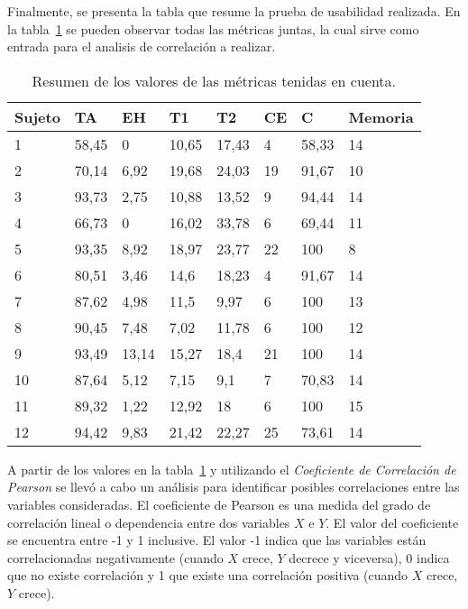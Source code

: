 Finalmente, se presenta la tabla que resume la prueba de usabilidad realizada. En la tabla~\ref{sec:tabla-resumen-prueba}
se pueden observar todas las m\'etricas juntas, la cual sirve como entrada para el analisis de correlaci\'on a realizar.

\begin{table}[H]
\centering
\footnotesize
\begin{tabular}{|p{1.6cm}|p{1.6cm}|p{1.6cm}|p{1.6cm}|p{1.6cm}|p{1.6cm}|p{1.6cm}|p{1.6cm}|}
\hline
    Sujeto & TA    &    EH & T1    & T2  & CE &  C    & Memoria \\
    \hline 
    1      & 58,45 & 0     & 10,65 & 17,43 & 4  & 58,33 & 14 \\
    2      & 70,14 & 6,92  & 19,68 & 24,03 & 19 & 91,67 & 10 \\
    3      & 93,73 & 2,75  & 10,88 & 13,52 & 9  & 94,44 & 14 \\
    4      & 66,73 & 0     & 16,02 & 33,78 & 6  & 69,44 & 11 \\
    5      & 93,35 & 8,92  & 18,97 & 23,77 & 22 & 100   & 8  \\
    6      & 80,51 & 3,46  & 14,6  & 18,23 & 4  & 91,67 & 14 \\
    7      & 87,62 & 4,98  &  11,5 & 9,97  & 6  & 100   & 13 \\
    8      & 90,45 & 7,48  & 7,02  & 11,78 & 6  & 100   & 12 \\
    9      & 93,49 & 13,14 & 15,27 & 18,4  & 21 & 100   & 14 \\
    10     & 87,64 & 5,12  & 7,15  & 9,1   & 7  & 70,83 & 14 \\
    11     & 89,32 & 1,22  & 12,92 & 18    & 6  & 100   & 15 \\
    12     & 94,42 & 9,83  & 21,42 & 22,27 & 25 & 73,61 & 14 \\
\hline
\end{tabular}
\caption{Resumen de los valores de las métricas tenidas en cuenta.}
\label{sec:tabla-resumen-prueba}
\end{table}

A partir de los valores en la tabla~\ref{sec:tabla-resumen-prueba} y utilizando el \emph{Coeficiente de 
Correlaci\'on de Pearson}\cite{BoslaughStatistics2008} se llev\'o a cabo un an\'alisis  para identificar posibles
correlaciones entre las variables consideradas. El coeficiente de Pearson es una medida del grado de 
correlaci\'on lineal o dependencia entre dos variables $X$ e $Y$. El valor del coeficiente se encuentra entre
-1 y 1 inclusive. El valor -1 indica que las variables est\'an correlacionadas negativamente 
(cuando $X$ crece, $Y$ decrece y viceversa), 0 indica que no existe correlaci\'on y 1 que existe una correlaci\'on
positiva (cuando $X$ crece, $Y$ crece).

